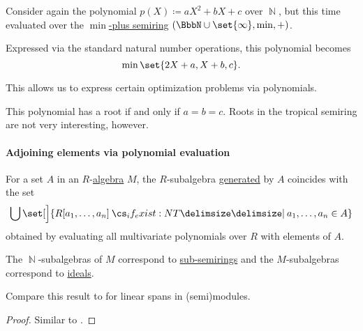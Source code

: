 \begin{example}
\begin{thmenum}
     Consider again the polynomial \( p(X) \coloneqq aX^2 + bX + c \) over \( \BbbN \), but this time evaluated over the \hyperref[def:tropical_semiring]{\( \min \)-plus semiring} \( (\BbbN \cup \set{ \infty }, \min, +) \).

    Expressed via the standard natural number operations, this polynomial becomes
    \begin{equation*}
      \min\set{ 2X + a, X + b, c }.
    \end{equation*}

    This allows us to express certain optimization problems via polynomials.

    This polynomial has a root if and only if \( a = b = c \). Roots in the tropical semiring are not very interesting, however.
  \end{thmenum}
\end{example}

\paragraph{Adjoining elements via polynomial evaluation}

\begin{proposition}\label{thm:generators_via_polynomials}
  For a set \( A \) in an \( R \)-\hyperref[def:algebra_over_semiring]{algebra} \( M \), the \( R \)-subalgebra \hyperref[def:algebra_over_semiring/generated]{generated} by \( A \) coincides with the set
  \begin{equation*}
    \bigcup \set[\Big]{ R[a_1, \ldots, a_n] \given* a_1, \ldots, a_n \in A }
  \end{equation*}
  obtained by evaluating all multivariate polynomials over \( R \) with elements of \( A \).
\end{proposition}
\begin{comments}
  \item The \( \BbbN \)-subalgebras of \( M \) correspond to \hyperref[def:semiring/submodel]{sub-semirings} and the \( M \)-subalgebras correspond to \hyperref[def:semiring_ideal/generated]{ideals}.

  \item Compare this result to  for linear spans in (semi)modules.
\end{comments}
\begin{proof}
  Similar to .
\end{proof}

